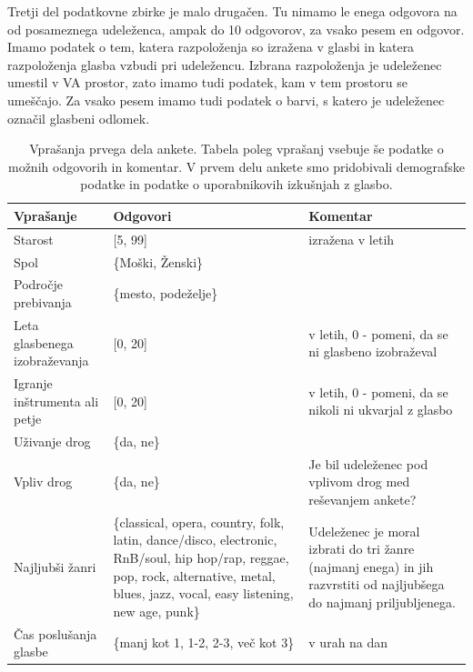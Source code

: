 \documentclass[a4paper, 12pt]{book}
\begin{document}
{Tretji del podatkovne zbirke je malo drugačen. Tu nimamo le enega odgovora na od posameznega udeleženca, ampak do 10 odgovorov, za vsako pesem en odgovor. Imamo podatek o tem, katera razpoloženja so izražena v glasbi in katera razpoloženja glasba vzbudi pri udeležencu. Izbrana razpoloženja je udeleženec umestil v VA prostor, zato imamo tudi podatek, kam v tem prostoru se umeščajo.  Za vsako pesem imamo tudi podatek o barvi, s katero je udeleženec označil glasbeni odlomek.  



\begin{table}[H]
\begin{center}
\caption{Vprašanja prvega dela ankete. Tabela poleg vprašanj vsebuje še podatke o možnih odgovorih in komentar. V prvem delu ankete smo pridobivali demografske podatke in podatke o uporabnikovih izkušnjah z glasbo.}
\begin{tabular}{| p{3.5cm} | p{4.5cm} | p{4.5cm} |}
\hline
Vprašanje & Odgovori & Komentar \\ \hline \hline
Starost & [5, 99] & izražena v letih \\ \hline
Spol & \{Moški, Ženski\} & \\ \hline
Področje prebivanja & \{mesto, podeželje\} & \\ \hline
Leta glasbenega izobraževanja & [0, 20] & v letih, 0 - pomeni, da se ni glasbeno izobraževal \\ \hline
Igranje inštrumenta ali petje & [0, 20] & v letih, 0 - pomeni, da se nikoli ni ukvarjal z glasbo \\ \hline
Uživanje drog & \{da, ne\} & \\ \hline
Vpliv drog & \{da, ne\} &  Je bil udeleženec pod vplivom drog med reševanjem ankete? \\ \hline
Najljubši žanri & \{classical, opera, country, folk, latin, dance/disco, electronic, RnB/soul, hip hop/rap, reggae, pop, rock, alternative, metal, blues, jazz, vocal, easy listening, new age, punk\} & Udeleženec je moral izbrati do tri žanre (najmanj enega) in jih razvrstiti od najljubšega do najmanj priljubljenega. \\ \hline
Čas poslušanja glasbe & \{manj kot 1, 1-2, 2-3, več kot 3\} & v urah na dan \\ \hline

\end{tabular}
\label{prvidel}
\end{center}
\end{table} 

}
\end{document}
